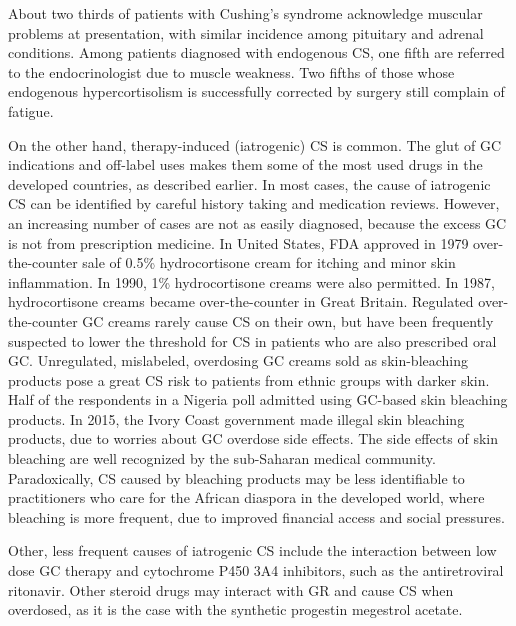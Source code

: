 \documentclass[12pt,english]{report}\usepackage[]{graphicx}\usepackage[]{color}
\begin{document}
About two thirds of patients with Cushing's syndrome acknowledge muscular
problems at presentation, with similar incidence among pituitary and
adrenal conditions\citep{valassi2011european}. Among patients diagnosed
with endogenous CS, one fifth are referred to the endocrinologist
due to muscle weakness\citep{muller2006diagnosis}. Two fifths of
those whose endogenous hypercortisolism is successfully corrected
by surgery still complain of fatigue\citep{lindsay2006long-term}. 

On the other hand, therapy-induced (iatrogenic) CS is common. The
glut of GC indications and off-label uses makes them some of the most
used drugs in the developed countries, as described earlier. In most
cases, the cause of iatrogenic CS can be identified by careful history
taking and medication reviews. However, an increasing number of cases
are not as easily diagnosed, because the excess GC is not from prescription
medicine. In United States, FDA approved in 1979 over-the-counter
sale of 0.5\% hydrocortisone cream for itching and minor skin inflammation.
In 1990, 1\% hydrocortisone creams were also permitted\citep{ravis2007topical}.
In 1987, hydrocortisone creams became over-the-counter in Great Britain.
Regulated over-the-counter GC creams rarely cause CS on their own,
but have been frequently suspected to lower the threshold for CS in
patients who are also prescribed oral GC. Unregulated, mislabeled,
overdosing GC creams sold as skin-bleaching products pose a great
CS risk to patients from ethnic groups with darker skin. Half of the
respondents in a Nigeria poll admitted using GC-based skin bleaching
products\citep{adebajo2002epidemiological}. In 2015, the Ivory Coast
government made illegal skin bleaching products, due to worries about
GC overdose side effects\citep{france-presse2015ivory}. The side
effects of skin bleaching are well recognized by the sub-Saharan medical
community. Paradoxically, CS caused by bleaching products may be less
identifiable to practitioners who care for the African diaspora in
the developed world, where bleaching is more frequent, due to improved
financial access and social pressures\citep{olumide2008complications,rozen2012cosmetic}. 

Other, less frequent causes of iatrogenic CS include the interaction
between low dose GC therapy and cytochrome P450 3A4 inhibitors, such
as the antiretroviral ritonavir\citep{foisy2008adrenal}. Other steroid
drugs may interact with GR and cause CS when overdosed, as it is the
case with the synthetic progestin megestrol acetate\citep{mann1997glucocorticoidlike}.
\end{document}
